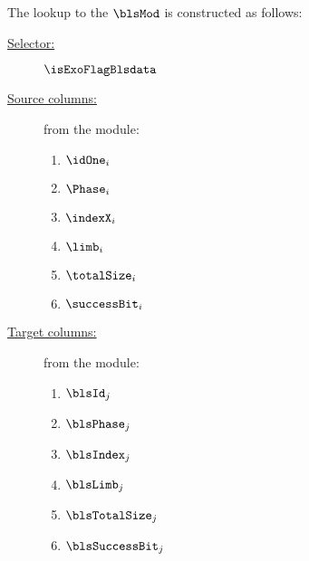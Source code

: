 The lookup to the $\blsMod$ is constructed as follows:
\begin{description}
	\item[\underline{Selector:}] $\isExoFlagBlsdata$
	\item[\underline{Source columns:}] from the \mmioMod{} module:
		\begin{multicols}{3}
			\begin{enumerate}
				\item $\idOne      _{i}$
				\item $\Phase      _{i}$
				\item $\indexX     _{i}$
				\item $\limb       _{i}$
				\item $\totalSize  _{i}$
				\item $\successBit _{i}$
			\end{enumerate}
		\end{multicols}
	\item[\underline{Target columns:}] from the \blsMod{} module: 
		\begin{multicols}{3}
			\begin{enumerate}
				\item $\blsId         _{j}$
				\item $\blsPhase      _{j}$
				\item $\blsIndex      _{j}$
				\item $\blsLimb       _{j}$
				\item $\blsTotalSize  _{j}$
				\item $\blsSuccessBit _{j}$
			\end{enumerate}
		\end{multicols}
\end{description}
